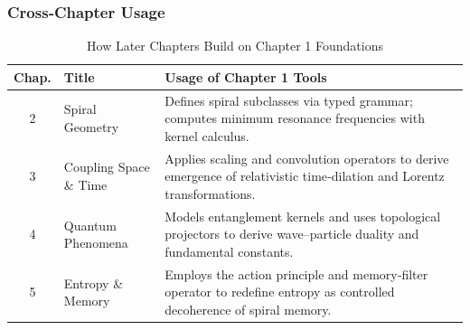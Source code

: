 \newpage

\subsubsection{Cross‐Chapter Usage}
\begin{table}[ht]
  \centering
  \caption{How Later Chapters Build on Chapter 1 Foundations}
  \label{tab:cross-chapter}
  \begin{tabular}{@{}clp{8cm}@{}}
    \toprule
    \textbf{Chap.} & \textbf{Title}                          & \textbf{Usage of Chapter 1 Tools} \\
    \midrule
    2              & Spiral Geometry                         & Defines spiral subclasses via typed grammar; computes minimum resonance frequencies with kernel calculus. \\
    3              & Coupling Space \& Time                  & Applies scaling and convolution operators to derive emergence of relativistic time‐dilation and Lorentz transformations. \\
    4              & Quantum Phenomena                       & Models entanglement kernels and uses topological projectors to derive wave–particle duality and fundamental constants. \\
    5              & Entropy \& Memory                       & Employs the action principle and memory‐filter operator to redefine entropy as controlled decoherence of spiral memory. \\
    \bottomrule
  \end{tabular}
\end{table}
